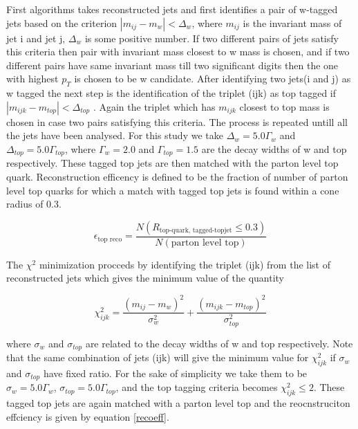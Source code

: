 \documentclass[12pt,a4paper]{article}		%
\begin{document}
	 First algorithms takes reconstructed jets and first identifies a pair of w-tagged jets based on the criterion
	 $| m_{ij} - m_w | < \Delta_w$, where $m_{ij}$ is the invariant mass of jet i and jet j, $\Delta_w$ is some positive number. If two different pairs of jets satisfy this criteria then pair with invariant mass closest to w mass is chosen, and if two different pairs have same invariant mass till two significant digits then the one with highest $p_T$ is chosen to be w candidate. After identifying two jets(i and j) as w tagged the next step is the identification of the triplet (ijk) as top tagged if $|m_{ijk} -  m_{top}| < \Delta_{top}$ . Again the triplet which has $m_{ijk}$ closest to top mass is chosen in case two pairs satisfying this criteria. The process is repeated untill all the jets have been analysed. For this study we take $\Delta_w = 5.0\Gamma_w$ and $\Delta_{top} = 5.0\Gamma_{top}$, where $\Gamma_w = 2.0$ \cite{pdg-w} and $\Gamma_{top} = 1.5$\cite{pdg-top} are the decay widths of w and top respectively. These tagged top jets are then matched with the parton level top quark. Reconstruction efficency is defined to be the fraction of number of parton level top quarks for which a match with tagged top jets  is found within a cone radius of 0.3. 
	 
	 \begin{equation}
	 \epsilon_{\text{top reco}} = \frac{N(R_{ \text{top-quark,  tagged-topjet}} \le 0.3 )}{N( \text{parton level top})}
	 \label{recoeff}	
	 \end{equation}
	 
The $\chi^2$ minimization procceds by identifying the triplet (ijk) from the list of reconstructed jets which gives the minimum value of the quantity  

	\begin{equation}
		\chi_{ijk}^2 = \frac{ \left(m_{ij} - m_{w} \right)^2 }{ \sigma_w^2}	+  \frac{ \left(m_{ijk} - m_{top} \right)^2 }{ \sigma_{top}^2}
		\label{chisq}
	\end{equation}

where $\sigma_w$ and $\sigma_{top}$ are related to the decay widths of w and top respectively. Note that the same combination of jets (ijk)  will give the minimum value for $\chi_{ijk}^2$ if $\sigma_w$ and $\sigma_{top}$ have fixed ratio. For the sake of simplicity we take them to be $\sigma_w = 5.0\Gamma_w$, $\sigma_{top} = 5.0\Gamma_{top}$, and the top tagging criteria becomes $\chi_{ijk}^2 \le 2$. These tagged top jets are again matched with a parton level top and the reocnstruciton effciency is given by equation \ref{recoeff}. 
\end{document}
